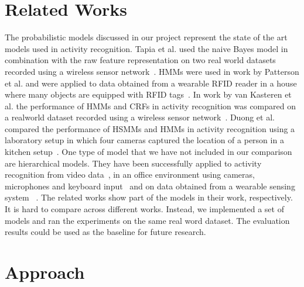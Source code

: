 \documentclass[11pt, oneside]{article}   	%
\begin{document}

\section{Related Works}

The probabilistic models discussed in our project represent the state of the art models used in activity recognition. Tapia et al. used the naive Bayes model in combination with the raw feature representation on two real world datasets recorded using a wireless sensor network~\cite{emtapia}. HMMs were used in work by Patterson et al. and were applied to data obtained from a wearable RFID reader in a house where many objects are equipped with RFID tags~\cite{djpatt}. In work by van Kasteren et al. the performance of HMMs and CRFs in activity recognition was compared on a realworld dataset recorded using a wireless sensor network~\cite{tvkasteren}. Duong et al. compared the performance of HSMMs and HMMs in activity recognition using a laboratory setup in which four cameras captured the location of a person in a kitchen setup~\cite{tduong}. One type of model that we have not included in our comparison are hierarchical models. They have been successfully applied to activity recognition from video data~\cite{sluhr}, in an office environment using cameras, microphones and keyboard input~\cite{noliver} and on data obtained from a wearable sensing system ~\cite{asubr}.
The related works show part of the models in their work, respectively. It is hard to compare across different works. Instead, we implemented a set of models and ran the experiments on the same real word dataset. The evaluation results could be used as the baseline for future research. 


\section{Approach}
\end{document}

